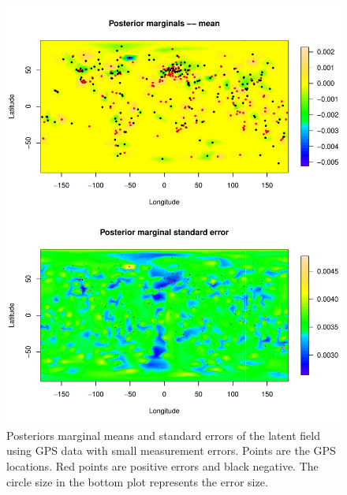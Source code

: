 \documentclass[a4paper,12pt]{article}
\begin{document}
  \begin{figure}[htbp]
 \begin{center}
 \includegraphics[scale=0.8]{fig/sMesh_sErr_GIAfield.pdf}
 \end{center}
 \caption[Posterior marginals of the latent field]{Posteriors marginal means and standard errors of the latent field using GPS data with small measurement errors. Points are the GPS locations. Red points are positive errors and black negative. The circle size in the bottom plot represents the error size.}
 \label{fig:3}
 \end{figure}
 
\end{document}
